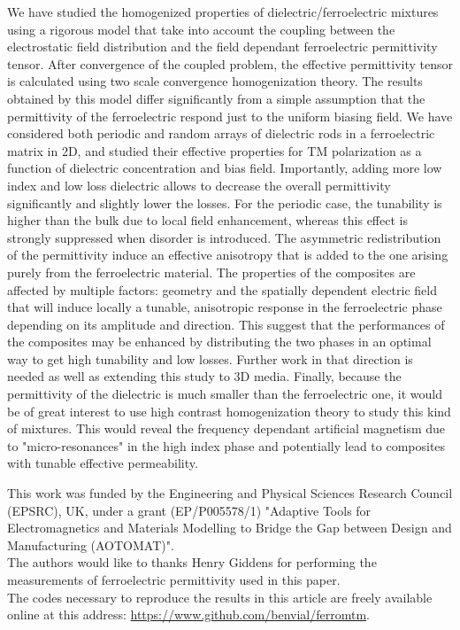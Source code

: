 \documentclass[%
 aip,
 amsmath,amssymb,
 reprint,%
linenumbers
]{revtex4-1}
\begin{document}
We have studied the homogenized properties of dielectric/ferroelectric mixtures
using a rigorous model that take into account the coupling between the electrostatic
field distribution and the field dependant ferroelectric permittivity tensor. After
convergence of the coupled problem, the effective permittivity tensor is calculated using
two scale convergence homogenization theory.
The results obtained by this model differ significantly from a simple assumption that
the permittivity of the ferroelectric respond just to the uniform biasing field.
We have considered both periodic and random arrays
of dielectric rods in a ferroelectric matrix in 2D, and studied their effective properties
for TM polarization as a function of dielectric concentration and bias field.
Importantly, adding more low index and low loss dielectric allows to decrease
the overall permittivity significantly and slightly lower the losses.
For the periodic case, the tunability is higher than the bulk due to local field enhancement, whereas
this effect is strongly suppressed when disorder is introduced. The asymmetric redistribution of the permittivity
induce an effective anisotropy that is added to the one arising purely from the ferroelectric material.
The properties of the composites are affected by multiple factors:
geometry and the spatially dependent electric field that will induce locally a tunable, anisotropic
response in the ferroelectric phase depending on its amplitude and direction.
This suggest that the performances of the composites
may be enhanced by distributing the two phases in an optimal way to get high
tunability and low losses. Further work in that direction is needed as well as
extending this study to 3D media.
Finally, because the permittivity of the dielectric is much smaller than the ferroelectric one,
it would be of great interest to use high contrast homogenization theory
\cite{bouchitte_homogenization_2004, cherednichenko_homogenization_2015} to
study this kind of mixtures.
This would reveal the frequency dependant artificial magnetism due to "micro-resonances"
in the high index phase and potentially lead to composites with tunable effective permeability.\\


\begin{acknowledgments}
This work was funded by the Engineering and Physical Sciences Research
Council (EPSRC), UK, under a grant (EP/P005578/1) "Adaptive Tools for
Electromagnetics and Materials Modelling to Bridge the Gap between
Design and Manufacturing (AOTOMAT)".\\
The authors would like to thanks Henry Giddens for performing the
measurements of ferroelectric permittivity used in this paper.\\
%
The codes necessary to reproduce the results in this article are freely
available online at this address: \href{https://www.github.com/benvial/ferromtm}{https://www.github.com/benvial/ferromtm}.
\end{acknowledgments}
\end{document}
